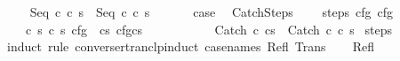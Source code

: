 \begin{isabellebody}
\ \ \isamarkupfalse%
\ {\isachardoublequoteopen}{\isasymGamma}{\isasymturnstile}\ {\isacharparenleft}Seq\ c\ c\ s{\isacharprime}{\isacharprime}{\isacharparenright}\ {\isasymrightarrow}\isactrlsup {\isacharasterisk}\ {\isacharparenleft}Seq\ c\ c\ s{\isacharprime}{\isacharparenright}{\isachardoublequoteclose}\ \isacommand{{\isachardot}}\isamarkupfalse%
\isanewline
\ \ \isamarkupfalse%
\ \isamarkupfalse%
\ {\isacharquery}case\ \isacommand{{\isachardot}}\isamarkupfalse%
\isanewline
{}\isamarkupfalse%
%
\endisatagproof
{\isafoldproof}%
%
\isadelimproof
\isanewline
%
\endisadelimproof
\isanewline
\isanewline
{}\isamarkupfalse%
\ CatchSteps{\isacharcolon}\ \isanewline
\ \ \ steps{\isacharcolon}\ {\isachardoublequoteopen}{\isasymGamma}{\isasymturnstile}cfg\isactrlsup {\isacharasterisk}\ cfg\isanewline
\ \ \ {\isachardoublequoteopen}{\isasymAnd}\ c\ s\ c\ s{\isacharprime}{\isachardot}\ {\isasymlbrakk}cfg\ {\isacharequal}\ {\isacharparenleft}cs{\isacharparenright}{\isacharsemicolon}\ cfgcs{\isacharprime}{\isacharparenright}{\isasymrbrakk}\isanewline
\ \ \ \ \ \ \ \ \ \ {\isasymLongrightarrow}\ {\isasymGamma}{\isasymturnstile}{\isacharparenleft}Catch\ c\ cs{\isacharparenright}\ {\isasymrightarrow}\isactrlsup {\isacharasterisk}\ {\isacharparenleft}Catch\ c\ c\ s{\isacharprime}{\isacharparenright}{\isachardoublequoteclose}\isanewline
%
\isadelimproof
%
\endisadelimproof
%
\isatagproof
{}\isamarkupfalse%
\ steps\isanewline
{}\isamarkupfalse%
\ {\isacharparenleft}induct\ rule{\isacharcolon}\ converse{\isacharunderscore}rtranclp{\isacharunderscore}induct\ {\isacharbrackleft}case{\isacharunderscore}names\ Refl\ Trans{\isacharbrackright}{\isacharparenright}\isanewline
\ \ \isamarkupfalse%
\ Refl\isanewline
\ \ \isamarkupfalse%

\end{isabellebody}
